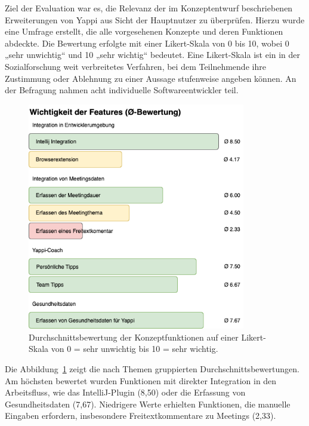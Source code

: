 \documentclass[12pt,a4paper]{report}
\begin{document}
Ziel der Evaluation war es, die Relevanz der im Konzeptentwurf beschriebenen Erweiterungen von Yappi aus
Sicht der Hauptnutzer zu überprüfen.
Hierzu wurde eine Umfrage erstellt, die alle vorgesehenen Konzepte und deren Funktionen abdeckte.
Die Bewertung erfolgte mit einer Likert-Skala von 0 bis 10, wobei 0 „sehr unwichtig“ und 10 „sehr wichtig“ bedeutet.
Eine Likert-Skala ist ein in der Sozialforschung weit verbreitetes Verfahren, bei dem Teilnehmende ihre Zustimmung
oder Ablehnung zu einer Aussage stufenweise angeben können.
An der Befragung nahmen acht individuelle Softwareentwickler teil.

\begin{figure}[!htbp]
  \centering
  \includegraphics[width=0.85\textwidth]{../figures/konzept-eval-feature-wichtigkeit.drawio.png}
  \caption{Durchschnittsbewertung der Konzeptfunktionen auf einer Likert-Skala von 0 = sehr unwichtig bis 10 = sehr wichtig.}
  \label{fig:konzept-eval-feature-wichtigkeit}
\end{figure}

Die Abbildung~\ref{fig:konzept-eval-feature-wichtigkeit} zeigt die nach Themen gruppierten Durchschnittsbewertungen.
Am höchsten bewertet wurden Funktionen mit direkter Integration in den Arbeitsfluss, wie das IntelliJ-Plugin (8,50)
oder die Erfassung von Gesundheitsdaten (7,67).
Niedrigere Werte erhielten Funktionen, die manuelle Eingaben erfordern, insbesondere Freitextkommentare zu Meetings (2,33).
\end{document}
